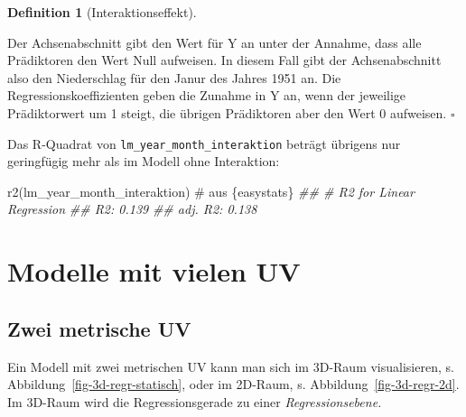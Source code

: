 \documentclass[
  letterpaper,
]{scrbook}
\newenvironment{Shaded}{\begin{snugshade}}{\end{snugshade}}
\newcommand{\CommentTok}[1]{\textcolor[rgb]{0.37,0.37,0.37}{#1}}
\newcommand{\DocumentationTok}[1]{\textcolor[rgb]{0.37,0.37,0.37}{\textit{#1}}}
\newcommand{\FunctionTok}[1]{\textcolor[rgb]{0.28,0.35,0.67}{#1}}
\newcommand{\NormalTok}[1]{\textcolor[rgb]{0.00,0.23,0.31}{#1}}
\theoremstyle{definition}
\theoremstyle{definition}
\theoremstyle{definition}
\newtheorem{definition}{Definition}[chapter]
\theoremstyle{remark}
\begin{document}
\begin{definition}[Interaktionseffekt]
\begin{tcolorbox}
Der Achsenabschnitt gibt den Wert für Y an unter der Annahme, dass alle
Prädiktoren den Wert Null aufweisen. In diesem Fall gibt der
Achsenabschnitt also den Niederschlag für den Janur des Jahres 1951 an.
Die Regressionskoeffizienten geben die Zunahme in Y an, wenn der
jeweilige Prädiktorwert um 1 steigt, die übrigen Prädiktoren aber den
Wert 0 aufweisen. \(\square\)

\end{tcolorbox}

Das R-Quadrat von \texttt{lm\_year\_month\_interaktion} beträgt übrigens
nur geringfügig mehr als im Modell ohne Interaktion:

\begin{Shaded}
\begin{Highlighting}[]
\FunctionTok{r2}\NormalTok{(lm\_year\_month\_interaktion)  }\CommentTok{\# aus \textasciigrave{}\{easystats\}\textasciigrave{}}
\DocumentationTok{\#\# \# R2 for Linear Regression}
\DocumentationTok{\#\#        R2: 0.139}
\DocumentationTok{\#\#   adj. R2: 0.138}
\end{Highlighting}
\end{Shaded}

\section{Modelle mit vielen UV}\label{modelle-mit-vielen-uv}

\subsection{Zwei metrische UV}\label{zwei-metrische-uv}

Ein Modell mit zwei metrischen UV kann man sich im 3D-Raum
visualisieren, s. Abbildung~\ref{fig-3d-regr-statisch}, oder im 2D-Raum,
s. Abbildung~\ref{fig-3d-regr-2d}. Im 3D-Raum wird die Regressionsgerade
zu einer \emph{Regressionsebene.}

\begin{figure}

\begin{minipage}{0.33\linewidth}


\end{minipage}
\end{figure}
\end{definition}
\end{document}
